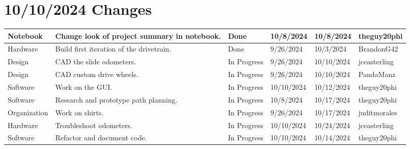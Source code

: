 \section{10/10/2024 Changes}
\begin{center}
\begin{longtable}{| p{40pt} | p{150pt} | p{35pt} | p{33pt} | p{33pt} | p{40pt} |}
\hline \rowcolor{DarkSeaGreen1}
Notebook & Change look of project summary in notebook. & Done & 10/8/2024 & 10/8/2024 & theguy20phi \\
\hline \rowcolor{DarkSeaGreen1}
Hardware & Build first iteration of the drivetrain. & Done & 9/26/2024 & 10/3/2024 & BrandonG42 \\
\hline \rowcolor{LightGoldenrod1}
Design & CAD the slide odometers. & In Progress & 9/26/2024 & 10/10/2024 & jceasterling \\
\hline \rowcolor{LightGoldenrod1}
Design & CAD custom drive wheels. & In Progress & 9/26/2024 & 10/10/2024 & PandaManz \\
\hline \rowcolor{LightGoldenrod1}
Software & Work on the GUI. & In Progress & 10/10/2024 & 10/12/2024 & theguy20phi \\
\hline \rowcolor{LightGoldenrod1}
Software & Research and prototype path planning. & In Progress & 10/8/2024 & 10/17/2024 & theguy20phi \\
\hline \rowcolor{LightGoldenrod1}
Organization & Work on shirts. & In Progress & 9/26/2024 & 10/17/2024 & juditmorales \\
\hline \rowcolor{LightGoldenrod1}
Hardware & Troubleshoot odometers. & In Progress & 10/10/2024 & 10/24/2024 & jceasterling \\
\hline \rowcolor{LightGoldenrod1}
Software & Refactor and document code. & In Progress & 10/10/2024 & 10/14/2024 & theguy20phi \\
\hline
\end{longtable}
\end{center}


